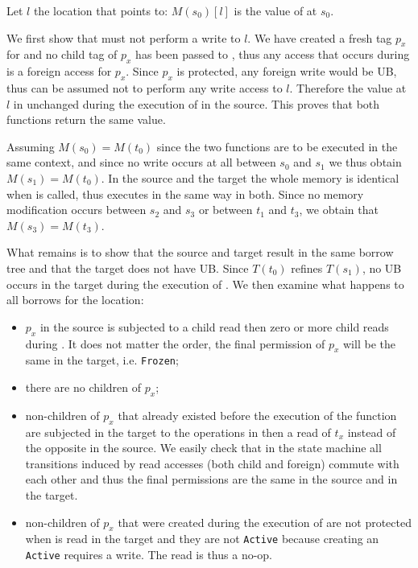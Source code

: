 \documentclass[a4paper,11pt]{article}
\theoremstyle{plain}
\theoremstyle{definition}
\theoremstyle{remark}
\newcommand{\tcode}[1]{\rstinline{#1}}
\newcommand{\tperm}[1]{\texttt{#1}}
\begin{document}
Let \(l\) the location that \tcode{x} points to: \(M(s_0)[l]\) is the value
of \tcode{*x} at \(s_0\).

We first show that \tcode{g} must not perform a write to \(l\). We have created
a fresh tag \(p_x\) for \tcode{x} and no child tag of \(p_x\) has been passed
to \tcode{g}, thus any access that occurs during \tcode{g} is a foreign access
for \(p_x\). Since \(p_x\) is protected, any foreign write would be UB, thus
\tcode{g} can be assumed not to perform any write access to \(l\).
Therefore the value at \(l\) in unchanged during the execution of \tcode{g} in
the source. This proves that both functions return the same value.

Assuming \(M(s_0) = M(t_0)\) since the two functions are to be executed in the
same context, and since no write occurs at all between \(s_0\) and \(s_1\)
we thus obtain \(M(s_1) = M(t_0)\). In the source and the target the whole memory
is identical when \tcode{g} is called, thus \tcode{g} executes in the same way
in both. Since no memory modification occurs between \(s_2\) and \(s_3\) or between
\(t_1\) and \(t_3\), we obtain that \(M(s_3) = M(t_3)\).

What remains is to show that the source and target result in the same
borrow tree and that the target does not have UB. Since \(T(t_0)\) refines
\(T(s_1)\), no UB occurs in the target during the execution of \tcode{g}.
We then examine what happens to all borrows for the location:
\begin{itemize}
    \item \(p_x\) in the source is subjected to a child read then zero or more
        child reads during \tcode{g}. It does not matter the order, the final
        permission of \(p_x\) will be the same in the target, i.e. \tperm{Frozen};
    \item there are no children of \(p_x\);
    \item non-children of \(p_x\) that already existed before the execution
        of the function are subjected in the target to the operations in \tcode{g}
        then a read of \(t_x\) instead of the opposite in the source. We easily
        check that in the state machine all transitions induced by read accesses
        (both child and foreign) commute with each other and thus the final
        permissions are the same in the source and in the target.
    \item non-children of \(p_x\) that were created during the execution of \tcode{g}
        are not protected when \tcode{*x} is read in the target and they are not
        \tperm{Active} because creating an \tperm{Active} requires a write.
        The read is thus a no-op.
\end{itemize}
\end{document}
